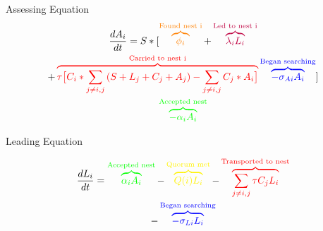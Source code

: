 \documentclass{beamer}
\makeatletter
\def\mcolor#1#{\@mcolor{#1}}
\def\@mcolor#1#2#3{%
  \protect\leavevmode
  \begingroup
    \color#1{#2}#3%
  \endgroup
}
\newcommand{\annotate}[3]{
\mcolor{#1}{\overbrace{#3}^\text{#2}}
}
\makeatother
\begin{document}
\begin{frame}{Assessing Equation}
\begin{multline}
\frac{dA_i}{dt} = S * [\annotate{orange}{Found nest i}{\phi_i} + \annotate{purple}{Led to nest i}{\lambda_iL_i} \\ + \annotate{red}{Carried to nest i}{\tau \big[ C_i * \sum_{j \neq i, j}{(S + L_j + C_j + A_j)} - \sum_{j \neq i, j}{C_j * A_i} \big] }   
\annotate{blue}{Began searching}{- \sigma_{Ai}A_i}] \\
    \annotate{green}{Accepted nest}{- \alpha_iA_i}
\end{multline}

% 

\end{frame}

\begin{frame}{Leading Equation}

\begin{multline}
    \frac{dL_i}{dt} = \annotate{green}{Accepted nest}{\alpha_iA_i} - \annotate{yellow}{Quorum met}{Q(i)L_i} - \annotate{red}{Transported to nest}{\sum_{j \neq i, j} \tau C_jL_i} \\ 
    - \annotate{blue}{Began searching}{- \sigma_{Li}L_i}
\end{multline}

\end{frame}
\end{document}

